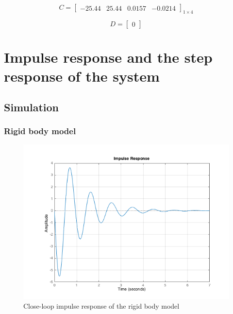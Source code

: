 \documentclass[a4paper, 12pt]{article}
\begin{document}
\begin{equation}\label{flexibleJordanC}
C = \begin{bmatrix}
-25.44	&	25.44	&	0.0157	&	-0.0214
\end{bmatrix}_{1\times 4}
\end{equation}

\begin{equation}
D = \begin{bmatrix} 0 \end{bmatrix}
\end{equation}

\vspace{7ex}
\section{Impulse response and the step response of the system}
\subsection{Simulation}
\subsubsection{Rigid body model}

\begin{figure}[!htbp]
\centering
\includegraphics[scale = 0.6]{ImpulseResponseNoControl}
\caption{Close-loop impulse response of the rigid body model}
\label{ImpulseResponseNoControl}
\end{figure}
\end{document}
